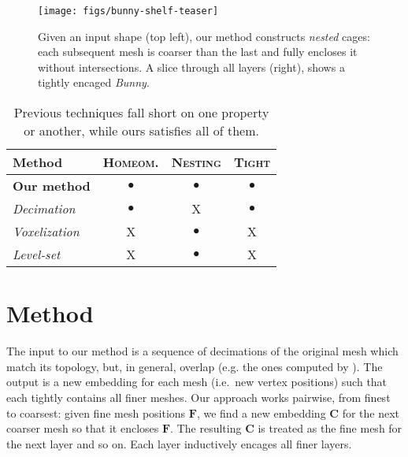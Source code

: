 \documentclass{cgyrf15}
\newcommand{\ra}[1]{\renewcommand{\arraystretch}{#1}}
\newcommand{\NO}{{\color{red}\textsf{X}}}
\newcommand{\YES}{$\bullet$}
\begin{document}
\begin{figure}[t]
  \texttt{[image: figs/bunny-shelf-teaser]} 
  \vspace*{-2em}
  \caption{Given an input shape (top left), our method constructs \emph{nested} cages:
each subsequent mesh is coarser than the last and fully encloses it without
intersections. A slice through all layers (right), shows a tightly
encaged \emph{Bunny}. 
  }
  \label{fig:bunny-shelf-teaser}
\end{figure}

\begin{table}
\centering
\ra{1.0}
\setlength{\tabcolsep}{5.5pt}
\begin{tabularx}{\linewidth}{X c c c}
\rowcolor{white}
\toprule
Method               & \textsc{Homeom.} & \textsc{Nesting}& \textsc{Tight} \\
\midrule                                                                       
\textbf{Our method}  & \YES                  & \YES            & \YES           \\
\emph{Decimation}                                                               
                     & \YES                  & \NO             & \YES           \\
\emph{Voxelization}                                                             
                     & \NO                   & \YES            & \NO            \\
\emph{Level-set}                                                                
                     & \NO                   & \YES            & \NO            \\
\bottomrule
\end{tabularx}
\vspace*{-1em}
\caption{
Previous techniques fall short
on one property or another, while ours satisfies all of them.}
\label{tab:feature-chart}
\end{table}

\section{Method}

The input to our method is a sequence of decimations of the original mesh which
match its topology, but, in general, overlap (e.g. the ones computed by
\cite{cgal}). The output is a new embedding for each mesh (i.e.\ new vertex
positions) such that each tightly contains all finer meshes. Our approach works
pairwise, from finest to coarsest: given fine mesh positions $\mathbf{F}$, we
find a new embedding $\mathbf{C}$ for the next coarser mesh so that it encloses
$\mathbf{F}$. The resulting $\mathbf{C}$ is treated as the fine mesh for the
next layer and so on. Each layer inductively encages all finer layers.
\end{document}
